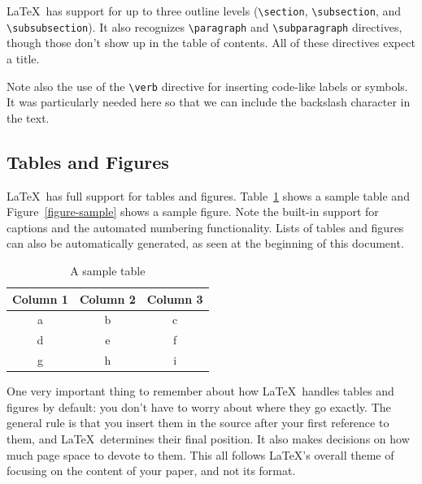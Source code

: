 \documentclass{article}
\begin{document}
\LaTeX\ has support for up to three outline levels (\verb!\section!, \verb!\subsection!, and \verb!\subsubsection!).  It also recognizes \verb!\paragraph! and \verb!\subparagraph! directives, though those don't show up in the table of contents.  All of these directives expect a title.

Note also the use of the \verb!\verb! directive for inserting code-like labels or symbols.  It was particularly needed here so that we can include the backslash character in the text.

\subsection{Tables and Figures}

\LaTeX\ has full support for tables and figures.  Table~\ref{table-sample} shows a sample table and Figure~\ref{figure-sample} shows a sample figure.  Note the built-in support for captions and the automated numbering functionality.  Lists of tables and figures can also be automatically generated, as seen at the beginning of this document.

\begin{table}
\centering
\begin{tabular}{|c|c|c|}\hline
Column 1 & Column 2 & Column 3 \\\hline\hline
a & b & c \\
d & e & f \\
g & h & i \\\hline
\end{tabular}

\caption{A sample table}
\label{table-sample}
\end{table}



One very important thing to remember about how \LaTeX\ handles tables and figures by default: you don't have to worry about where they go exactly.  The general rule is that you insert them in the source after your first reference to them, and \LaTeX\ determines their final position.  It also makes decisions on how much page space to devote to them.  This all follows \LaTeX's overall theme of focusing on the content of your paper, and not its format.
\end{document}
